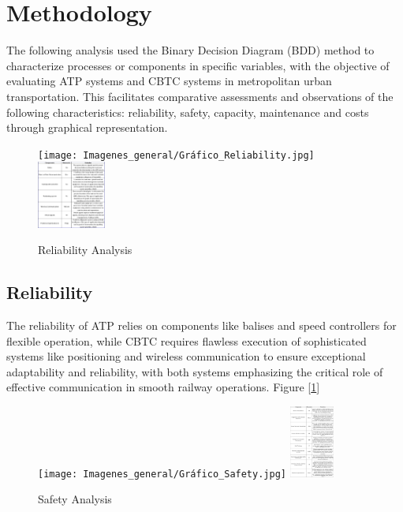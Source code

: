 \documentclass[conference]{IEEEtran}
\begin{document}
\section{Methodology}
The following analysis used the Binary Decision Diagram (BDD) \cite{b6} \cite{b5} method to characterize processes or components in specific variables, with the objective of evaluating ATP systems and CBTC systems in metropolitan urban transportation. This facilitates comparative assessments and observations of the following characteristics: reliability\cite{b7}, safety, capacity, maintenance and costs through graphical representation.
\begin{figure}[h]
 \centering
        \texttt{[image: Imagenes\_general/Gráfico\_Reliability.jpg]}
        \includegraphics[width=0.20\textwidth,scale=1]{Imagenes_general/Rliability_tabla.jpg}
\caption{Reliability Analysis}
 \label{fig:Reliability Analysis}
\end{figure}

\subsection{Reliability}
The reliability of ATP relies on components like balises and speed controllers for flexible operation, while CBTC requires flawless execution of sophisticated systems like positioning and wireless communication to ensure exceptional adaptability and reliability, with both systems emphasizing the critical role of effective communication in smooth railway operations. Figure [\ref{fig:Reliability Analysis}]\\
\begin{figure}[h]
    \centering
    \texttt{[image: Imagenes\_general/Gráfico\_Safety.jpg]}
    \includegraphics[width=0.13\textwidth,scale=1]{Imagenes_general/Tabla_Safety.png}
    \caption{Safety Analysis}
    \label{fig:Safety Analysis}
\end{figure}
\end{document}
